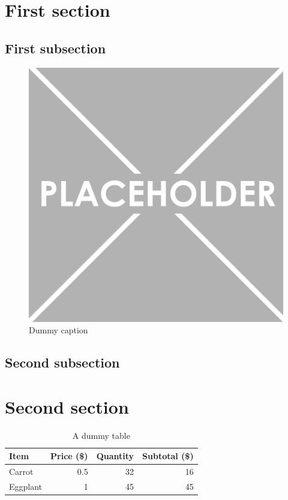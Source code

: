 \documentclass[11pt]{article}
\begin{document}
\makeReportFirstPage

\makeTOC

\section{First section}

\subsection{First subsection}

\lipsum[1]

\begin{figure}[!htbp]
\centering
\includegraphics[scale=0.1]{placeholder.png}
\caption{Dummy caption}
\label{fig:dummy-caption}
\end{figure}

\subsection{Second subsection}
\lipsum[2]

\section{Second section}
\lipsum[3]


\begin{table}[!htbp]
\centering
\begin{tabular}{lrrr}
\toprule
Item & Price (\$) & Quantity & Subtotal (\$) \\
\midrule
Carrot & 0.5 & 32 & 16 \\
Eggplant & 1 & 45 & 45 \\
\bottomrule
\end{tabular}
\caption{A dummy table}
\label{tab:courses}
\end{table}

\makeLOFT
\end{document}
